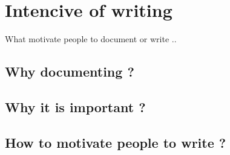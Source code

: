 \chapter{Intencive of writing}
What motivate people to document or write ..

\section{Why documenting ?}

\section{Why it is important ?}

\section{How to motivate people to write ?}
